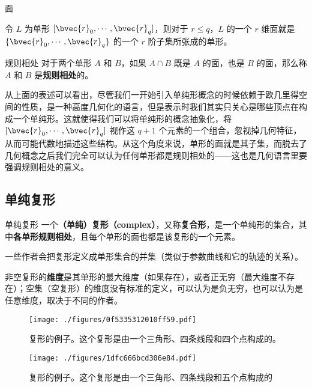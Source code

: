 \begin{definition}{面}

令 $L$ 为单形 $[\bvec{r}_0, \cdots, \bvec{r}_q]$，则对于 $r\leq q$，$L$ 的一个 $r$ 维面就是 $\{\bvec{r}_0, \cdots, \bvec{r}_q\}$ 的一个 $r$ 阶子集所张成的单形。

\end{definition}


\begin{definition}{规则相处}
对于两个单形 $A$ 和 $B$，如果 $A\cap B$ 既是 $A$ 的面，也是 $B$ 的面，那么称 $A$ 和 $B$ 是\textbf{规则相处}的。
\end{definition}


从上面的表述可以看出，尽管我们一开始引入单纯形概念的时候依赖于欧几里得空间的性质，是一种高度几何化的语言，但是表示时我们其实只关心是哪些顶点在构成一个单纯形。这就使得我们可以将单纯形的概念抽象化，将 $[\bvec{r}_0, \cdots, \bvec{r}_q]$ 视作这 $q+1$ 个元素的一个组合，忽视掉几何特征，从而可能代数地描述这些结构。从这个角度来说，单形的面就是其子集，而脱去了几何概念之后我们完全可以认为任何单形都是规则相处的——这也是几何语言里要强调规则相处的意义。

\subsection{单纯复形}

\begin{definition}{单纯复形}
一个\textbf{（单纯）复形（complex）}，又称\textbf{复合形}，是一个单纯形的集合，其中\textbf{各单形规则相处}，且每个单形的面也都是该复形的一个元素。

一些作者会把复形定义成单形集合的并集（类似于参数曲线和它的轨迹的关系）。

非空复形的\textbf{维度}是其单形的最大维度（如果存在），或者正无穷（最大维度不存在）；空集（空复形）的维度没有标准的定义，可以认为是负无穷，也可以认为是任意维度，取决于不同的作者。
\end{definition}

\begin{figure}[ht]
\centering
\texttt{[image: ./figures/0f5335312010ff59.pdf]}
\caption{复形的例子。这个复形是由一个三角形、四条线段和四个点构成的。} \label{fig_SimCom_1}
\end{figure}

\begin{figure}[ht]
\centering
\texttt{[image: ./figures/1dfc666bcd306e84.pdf]}
\caption{复形的例子。这个复形是由一个三角形、四条线段和五个点构成的} \label{fig_SimCom_2}
\end{figure}



